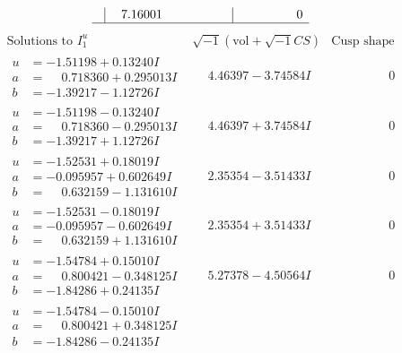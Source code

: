 \documentclass[1p]{elsarticle_modified}
\theoremstyle{definition}
\newcommand{\I}{\sqrt{-1}}
\begin{document}
$$\begin{array}{c|c|c}
 & \phantom{-}7.16001\phantom{ +0.000000I} & \phantom{-0.000000 } 0\\
 \hline 
 \end{array}$$\newpage$$\begin{array}{c|c|c}  
\text{Solutions to }I^u_{1}& \I (\text{vol} + \sqrt{-1}CS) & \text{Cusp shape}\\
 \hline 
\begin{aligned}
u &= -1.51198 + 0.13240 I \\
a &= \phantom{-}0.718360 + 0.295013 I \\
b &= -1.39217 - 1.12726 I\end{aligned}
 & \phantom{-}4.46397 - 3.74584 I & \phantom{-0.000000 } 0 \\ \hline\begin{aligned}
u &= -1.51198 - 0.13240 I \\
a &= \phantom{-}0.718360 - 0.295013 I \\
b &= -1.39217 + 1.12726 I\end{aligned}
 & \phantom{-}4.46397 + 3.74584 I & \phantom{-0.000000 } 0 \\ \hline\begin{aligned}
u &= -1.52531 + 0.18019 I \\
a &= -0.095957 + 0.602649 I \\
b &= \phantom{-}0.632159 - 1.131610 I\end{aligned}
 & \phantom{-}2.35354 - 3.51433 I & \phantom{-0.000000 } 0 \\ \hline\begin{aligned}
u &= -1.52531 - 0.18019 I \\
a &= -0.095957 - 0.602649 I \\
b &= \phantom{-}0.632159 + 1.131610 I\end{aligned}
 & \phantom{-}2.35354 + 3.51433 I & \phantom{-0.000000 } 0 \\ \hline\begin{aligned}
u &= -1.54784 + 0.15010 I \\
a &= \phantom{-}0.800421 - 0.348125 I \\
b &= -1.84286 + 0.24135 I\end{aligned}
 & \phantom{-}5.27378 - 4.50564 I & \phantom{-0.000000 } 0 \\ \hline\begin{aligned}
u &= -1.54784 - 0.15010 I \\
a &= \phantom{-}0.800421 + 0.348125 I \\
b &= -1.84286 - 0.24135 I\end{aligned}

\end{array}$$
\end{document}
